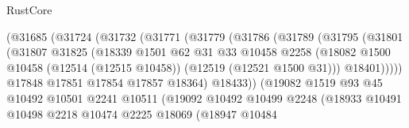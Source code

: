 \begin{lexlean}{RustCore}
\begin{coremodule}
                              (@31685
                                (@31724
                                  (@31732
                                    (@31771
                                      (@31779
                                        (@31786
                                          (@31789
                                            (@31795
                                              (@31801
                                                (@31807
                                                  @31825
                                                  (@18339
                                                    @1501
                                                    @62
                                                    @31
                                                    @33
                                                    @10458
                                                    @2258
                                                    (@18082
                                                      @1500
                                                      @10458
                                                      (@12514 (@12515 @10458))
                                                      (@12519 (@12521 @1500 @31)))
                                                    @18401)))))
                                          @17848
                                          @17851
                                          @17854
                                          @17857
                                          @18364)
                                        @18433))
                                    (@19082
                                      @1519
                                      @93
                                      @45
                                      @10492
                                      @10501
                                      @2241
                                      @10511
                                      (@19092
                                        @10492
                                        @10499
                                        @2248
                                        (@18933
                                          @10491
                                          @10498
                                          @2218
                                          @10474
                                          @2225
                                          @18069
                                          (@18947
                                            @10484

\end{coremodule}
\end{lexlean}
